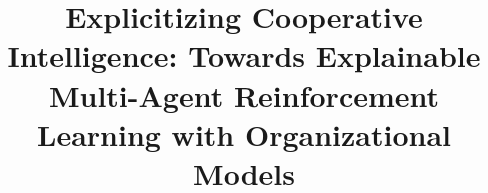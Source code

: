 \documentclass[doubleblind]{ecai}
\begin{document}

\begin{frontmatter}




    \title{Explicitizing Cooperative Intelligence: Towards Explainable Multi-Agent Reinforcement Learning with Organizational Models}







\end{frontmatter}
\end{document}
